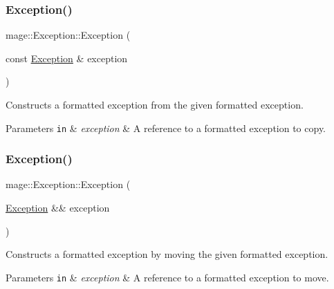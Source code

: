 \subsubsection{\texorpdfstring{Exception()}{Exception()}\hspace{0.1cm}{\footnotesize\ttfamily [4/5]}}
{\footnotesize\ttfamily mage\+::\+Exception\+::\+Exception (\begin{DoxyParamCaption}\item[{const \hyperlink{classmage_1_1_exception}{Exception} \&}]{exception }\end{DoxyParamCaption})\hspace{0.3cm}{\ttfamily [default]}}

Constructs a formatted exception from the given formatted exception.


\begin{DoxyParams}[1]{Parameters}
\mbox{\tt in}  & {\em exception} & A reference to a formatted exception to copy. \\
\hline
\end{DoxyParams}
\hypertarget{classmage_1_1_exception_a5a745eb8921cb986c822c0f95455314a}{}\label{classmage_1_1_exception_a5a745eb8921cb986c822c0f95455314a} 
\subsubsection{\texorpdfstring{Exception()}{Exception()}\hspace{0.1cm}{\footnotesize\ttfamily [5/5]}}
{\footnotesize\ttfamily mage\+::\+Exception\+::\+Exception (\begin{DoxyParamCaption}\item[{\hyperlink{classmage_1_1_exception}{Exception} \&\&}]{exception }\end{DoxyParamCaption})\hspace{0.3cm}{\ttfamily [default]}}

Constructs a formatted exception by moving the given formatted exception.


\begin{DoxyParams}[1]{Parameters}
\mbox{\tt in}  & {\em exception} & A reference to a formatted exception to move. \\
\hline
\end{DoxyParams}
\hypertarget{classmage_1_1_exception_a088e91ba8dffd31a9d6aa7d4af2ee2c0}{}\label{classmage_1_1_exception_a088e91ba8dffd31a9d6aa7d4af2ee2c0} 
